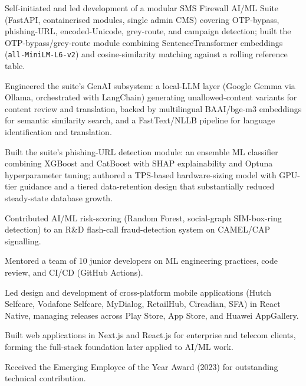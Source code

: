 \documentclass[10.5pt]{article}
\begin{document}
\begin{cvitems}
  \item Self-initiated and led development of a modular SMS Firewall AI/ML Suite (FastAPI, containerised modules, single admin CMS) covering OTP-bypass, phishing-URL, encoded-Unicode, grey-route, and campaign detection; built the OTP-bypass/grey-route module combining SentenceTransformer embeddings (\texttt{all-MiniLM-L6-v2}) and cosine-similarity matching against a rolling reference table.
  \item Engineered the suite's GenAI subsystem: a local-LLM layer (Google Gemma via Ollama, orchestrated with LangChain) generating unallowed-content variants for content review and translation, backed by multilingual BAAI/bge-m3 embeddings for semantic similarity search, and a FastText/NLLB pipeline for language identification and translation.
  \item Built the suite's phishing-URL detection module: an ensemble ML classifier combining XGBoost and CatBoost with SHAP explainability and Optuna hyperparameter tuning; authored a TPS-based hardware-sizing model with GPU-tier guidance and a tiered data-retention design that substantially reduced steady-state database growth.
  \item Contributed AI/ML risk-scoring (Random Forest, social-graph SIM-box-ring detection) to an R\&D flash-call fraud-detection system on CAMEL/CAP signalling.
  \item Mentored a team of 10 junior developers on ML engineering practices, code review, and CI/CD (GitHub Actions).
\end{cvitems}

\begin{cvitems}
  \item Led design and development of cross-platform mobile applications (Hutch Selfcare, Vodafone Selfcare, MyDialog, RetailHub, Circadian, SFA) in React Native, managing releases across Play Store, App Store, and Huawei AppGallery.
  \item Built web applications in Next.js and React.js for enterprise and telecom clients, forming the full-stack foundation later applied to AI/ML work.
  \item Received the Emerging Employee of the Year Award (2023) for outstanding technical contribution.
\end{cvitems}
\end{document}
